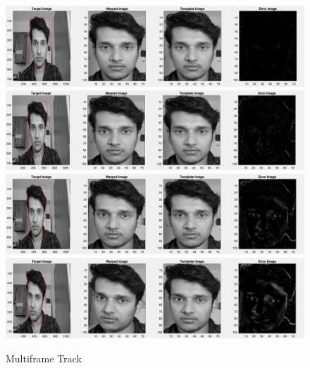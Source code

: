 \documentclass[letter, 10pt]{article}
\begin{document}
\begin{figure}[h]
        \centering
        \includegraphics[width=\textwidth]{HW2/RESULT/FRAME1.png}
    \endminipage\hfill
        \centering
        \includegraphics[width=\textwidth]{HW2/RESULT/FRAME2.png}
    \endminipage\hfill
        \centering
        \includegraphics[width=\textwidth]{HW2/RESULT/FRAME3.png}
    \endminipage\hfill
        \centering
        \includegraphics[width=\textwidth]{HW2/RESULT/FRAME4.png}
    \endminipage\hfill
    \caption{Multiframe Track}
\end{figure}
\end{document}
